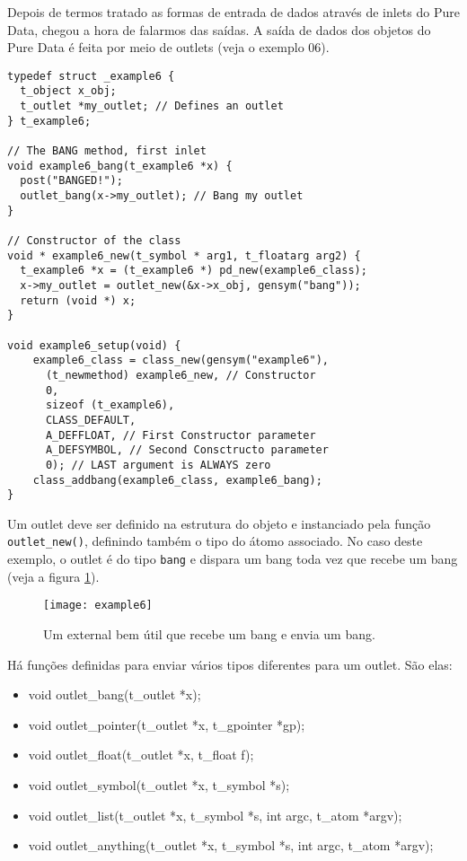 Depois de termos tratado as formas de entrada de dados através de inlets do
Pure Data, chegou a hora de falarmos das saídas. A saída de dados dos objetos
do Pure Data é feita por meio de outlets (veja o exemplo 06).

\begin{lstlisting}
typedef struct _example6 {
  t_object x_obj;
  t_outlet *my_outlet; // Defines an outlet
} t_example6;

// The BANG method, first inlet
void example6_bang(t_example6 *x) {
  post("BANGED!");
  outlet_bang(x->my_outlet); // Bang my outlet
}

// Constructor of the class
void * example6_new(t_symbol * arg1, t_floatarg arg2) {
  t_example6 *x = (t_example6 *) pd_new(example6_class);
  x->my_outlet = outlet_new(&x->x_obj, gensym("bang"));
  return (void *) x;
}

void example6_setup(void) {
    example6_class = class_new(gensym("example6"),
      (t_newmethod) example6_new, // Constructor
      0, 
      sizeof (t_example6),
      CLASS_DEFAULT,
      A_DEFFLOAT, // First Constructor parameter
      A_DEFSYMBOL, // Second Consctructo parameter
      0); // LAST argument is ALWAYS zero
    class_addbang(example6_class, example6_bang);
}
\end{lstlisting}

Um outlet deve ser definido na estrutura do objeto e instanciado pela função
\texttt{outlet\_new()}, definindo também o tipo do átomo associado. No caso
deste exemplo, o outlet é do tipo \texttt{bang} e dispara um bang toda vez que
recebe um bang (veja a figura \ref{fig:outlet-bang}).

\begin{figure}[h!]
\centering
\texttt{[image: example6]}
\caption{Um external bem útil que recebe um bang e envia um bang.}
\label{fig:outlet-bang}
\end{figure}

Há funções definidas para enviar vários tipos diferentes para um outlet.
São elas:

\begin{itemize}
\item void outlet\_bang(t\_outlet *x);
\item void outlet\_pointer(t\_outlet *x, t\_gpointer *gp);
\item void outlet\_float(t\_outlet *x, t\_float f);
\item void outlet\_symbol(t\_outlet *x, t\_symbol *s);
\item void outlet\_list(t\_outlet *x, t\_symbol *s, int argc, t\_atom *argv);
\item void outlet\_anything(t\_outlet *x, t\_symbol *s, int argc, t\_atom *argv);
\end{itemize}


